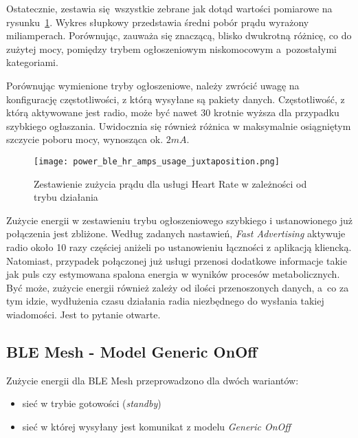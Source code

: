 Ostatecznie, zestawia się wszystkie zebrane jak dotąd wartości pomiarowe na rysunku~\ref{rys:power_ble_hr_amps_usage_juxtaposition}.
Wykres słupkowy przedstawia średni pobór prądu wyrażony miliamperach. Porównując, zauważa się znaczącą, blisko dwukrotną
różnicę, co do zużytej mocy, pomiędzy trybem ogłoszeniowym niskomocowym a~pozostałymi kategoriami.

Porównując wymienione tryby ogłoszeniowe, należy zwrócić uwagę na konfigurację częstotliwości, z którą wysyłane są
pakiety danych. Częstotliwość, z którą aktywowane jest radio, może być nawet 30 krotnie wyższa dla przypadku szybkiego ogłaszania.
Uwidocznia się również różnica w maksymalnie osiągniętym szczycie poboru mocy, wynosząca ok. $2mA$.

\begin{figure}[!ht]
	\centering \texttt{[image: power\_ble\_hr\_amps\_usage\_juxtaposition.png]}
	\caption{Zestawienie zużycia prądu dla usługi Heart Rate w zależności od trybu działania}
	\label{rys:power_ble_hr_amps_usage_juxtaposition}
\end{figure}

Zużycie energii w zestawieniu trybu ogłoszeniowego szybkiego i ustanowionego już połączenia jest zbliżone. Według zadanych nastawień,
\textit{Fast Advertising} aktywuje radio około 10 razy częściej aniżeli po ustanowieniu łączności z aplikacją kliencką. Natomiast,
przypadek połączonej już usługi przenosi dodatkowe informacje takie jak puls czy estymowana spalona energia w wyników procesów
metabolicznych. Być może, zużycie energii również zależy od ilości przenoszonych danych, a~co za tym idzie, 
wydłużenia czasu działania radia niezbędnego do wysłania takiej wiadomości. Jest to pytanie otwarte.

\subsection{BLE Mesh - Model Generic OnOff}

Zużycie energii dla \gls{BLE} Mesh przeprowadzono dla dwóch wariantów:
\begin{itemize}
\item sieć w trybie gotowości (\textit{standby})
\item sieć w której wysyłany jest komunikat z modelu \textit{Generic OnOff}
\end{itemize}

